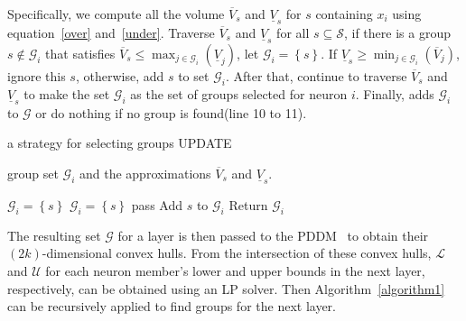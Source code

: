 \documentclass[runningheads]{llncs}
\begin{document}
Specifically, we compute all the volume $\overline{V}_{s}$ and $\underline{V}_{s}$ for $s$ containing $x_{i}$ using equation~\ref{over} and~\ref{under}.
Traverse $\overline{V}_{s}$ and $\underline{V}_{s}$ for all $s \subseteq \mathcal{S}$, 
if there is a group $s \notin \mathcal{G}_{i}$ that satisfies $\overline{V}_{s} \leq \max_{j\in \mathcal{G}_{i}}(\underline{V}_{j})$, let $\mathcal{G}_{i} = \left \{s\right \}$. If $\underline{V}_{s} \geq \min_{j\in \mathcal{G}_{i}}(\overline{V}_{j})$, ignore this $s$, otherwise, add $s$ to set $\mathcal{G}_{i}$. After that, continue to traverse $\overline{V}_{s}$ and $\underline{V}_{s}$ to make the set $\mathcal{G}_{i}$ as the set of groups selected for neuron $i$.
Finally, adds $\mathcal{G}_{i}$ to $\mathcal{G}$ or do nothing if no group is found(line 10 to 11).
\begin{algorithm}[!h]
   \caption{a strategy for selecting groups UPDATE}
   \label{algorithm2} 
\begin{algorithmic}[1]
   
    group set $\mathcal{G}_{i}$ and the approximations $\overline{V}_{s}$ and $\underline{V}_{s}$.
   

   \STATE $\mathcal{G}_{i}= \left\{s \right\}$
   \STATE $\mathcal{G}_{i} = \left \{s\right \}$
   \STATE pass
   \ELSE
   \STATE Add $s$ to $\mathcal{G}_{i}$
   \ENDIF
   \STATE Return $\mathcal{G}_{i}$

\end{algorithmic}
\end{algorithm}

The resulting set $\mathcal{G}$ for a layer is then passed to the PDDM~\cite{DBLP:journals/pacmpl/MullerMSPV22} to obtain their $(2k)$-dimensional convex hulls. 
From the intersection of these convex hulls, $\mathcal{L}$ and $\mathcal{U}$ for each neuron member's lower and upper bounds in the next layer, respectively, can be obtained using an LP solver.
Then Algorithm~\ref{algorithm1} can be recursively applied to find groups for the next layer. 
%
%
%
\end{document}
